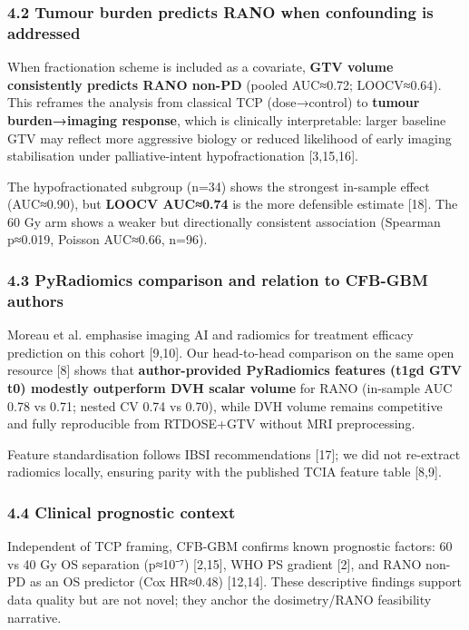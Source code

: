 \documentclass[
  11pt,
]{article}
\begin{document}
\subsubsection{4.2 Tumour burden predicts RANO when confounding is
addressed}\label{tumour-burden-predicts-rano-when-confounding-is-addressed}

When fractionation scheme is included as a covariate, \textbf{GTV volume
consistently predicts RANO non-PD} (pooled AUC≈0.72; LOOCV≈0.64). This
reframes the analysis from classical TCP (dose→control) to
\textbf{tumour burden→imaging response}, which is clinically
interpretable: larger baseline GTV may reflect more aggressive biology
or reduced likelihood of early imaging stabilisation under
palliative-intent hypofractionation {[}3,15,16{]}.

The hypofractionated subgroup (n=34) shows the strongest in-sample
effect (AUC≈0.90), but \textbf{LOOCV AUC≈0.74} is the more defensible
estimate {[}18{]}. The 60 Gy arm shows a weaker but directionally
consistent association (Spearman p≈0.019, Poisson AUC≈0.66, n=96).

\subsubsection{4.3 PyRadiomics comparison and relation to CFB-GBM
authors}\label{pyradiomics-comparison-and-relation-to-cfb-gbm-authors}

Moreau et al. emphasise imaging AI and radiomics for treatment efficacy
prediction on this cohort {[}9,10{]}. Our head-to-head comparison on the
same open resource {[}8{]} shows that \textbf{author-provided
PyRadiomics features (t1gd GTV t0) modestly outperform DVH scalar
volume} for RANO (in-sample AUC 0.78 vs 0.71; nested CV 0.74 vs 0.70),
while DVH volume remains competitive and fully reproducible from
RTDOSE+GTV without MRI preprocessing.

Feature standardisation follows IBSI recommendations {[}17{]}; we did
not re-extract radiomics locally, ensuring parity with the published
TCIA feature table {[}8,9{]}.

\subsubsection{4.4 Clinical prognostic
context}\label{clinical-prognostic-context}

Independent of TCP framing, CFB-GBM confirms known prognostic factors:
60 vs 40 Gy OS separation (p≈10⁻⁷) {[}2,15{]}, WHO PS gradient {[}2{]},
and RANO non-PD as an OS predictor (Cox HR≈0.48) {[}12,14{]}. These
descriptive findings support data quality but are not novel; they anchor
the dosimetry/RANO feasibility narrative.
\end{document}
